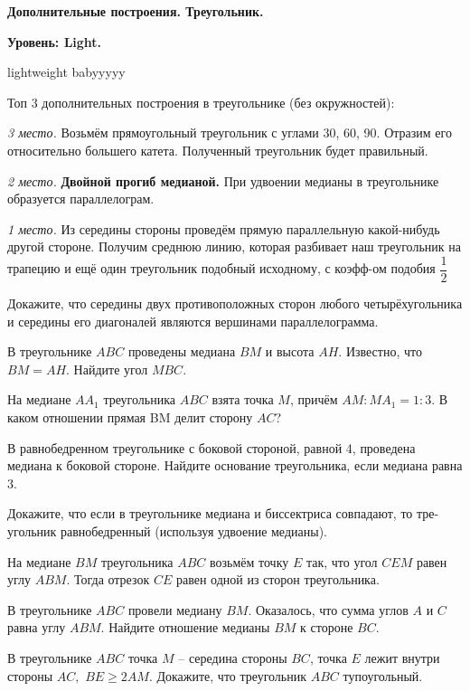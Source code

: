 \hspace{3mm}

\centerline{\bf \Huge  Дополнительные построения. Треугольник.}
\centerline{\bf \Huge Уровень: Light.}

\begin{flushright}
    \scriptsize{lightweight babyyyyy}
\end{flushright}


Топ 3 дополнительных построения в треугольнике (без окружностей):

\textit{3 место.} Возьмём прямоугольный треугольник с углами 30, 60, 90. Отразим его относительно большего катета. Полученный треугольник будет правильный.

\textit{2 место.} \textbf{Двойной прогиб медианой.} При удвоении медианы в треугольнике образуется параллелограм.

\textit{1 место.} Из середины стороны проведём прямую параллельную какой-нибудь другой стороне. Получим среднюю линию, которая разбивает наш треугольник на трапецию и ещё один треугольник подобный исходному, с коэфф-ом подобия $\dfrac{1}{2}$

Докажите, что середины двух противоположных сторон любого четырёхугольника и середины его диагоналей являются вершинами параллелограмма.


В треугольнике $ABC$ проведены медиана $BM$ и высота $AH$. Известно, что  $BM = AH$.  Найдите угол $MBC$.

На медиане $AA_1$ треугольника $ABC$ взята точка $M$, причём  $AM : MA_1 = 1:3$.  В каком отношении прямая BM делит сторону $AC$?

В равнобедренном треугольнике с боковой стороной, равной 4, проведена медиана к боковой стороне. Найдите основание треугольника, если медиана равна 3.

Докажите, что если в треугольнике медиана и биссектриса совпадают, то тре- угольник равнобедренный (используя удвоение медианы).

  На медиане $BM$ треугольника $ABC$ возьмём точку $E$ так, что угол $CEM$ равен углу $ABM$. Тогда отрезок $CE$ равен одной из сторон треугольника.

 В треугольнике $ABC$ провели медиану $BM$. Оказалось, что сумма углов $A$ и $C$ равна углу $ABM$. Найдите отношение медианы $BM$ к стороне $BC$.

 В треугольнике $ABC$ точка $M$ – середина стороны $BC$, точка $E$ лежит внутри стороны $AC,$  $BE\geq2AM.$  Докажите, что треугольник $ABC$ тупоугольный.
